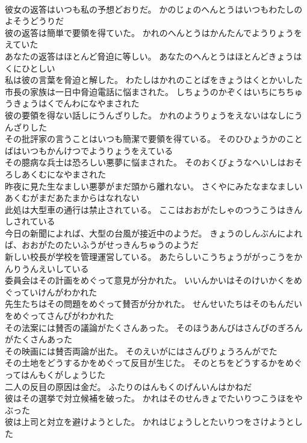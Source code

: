 \documentclass[8pt]{extreport}
\begin{document}
\begin{CJK}{UTF8}{min}
\\	彼女の返答はいつも私の予想どおりだ。	かのじょのへんとうはいつもわたしのよそうどうりだ 
\\	彼の返答は簡単で要領を得ていた。	かれのへんとうはかんたんでようりょうをえていた 
\\	あなたの返答はほとんど脅迫に等しい。	あなたのへんとうはほとんどきょうはくにひとしい 
\\	私は彼の言葉を脅迫と解した。	わたしはかれのことばをきょうはくとかいした 
\\	市長の家族は一日中脅迫電話に悩まされた。	しちょうのかぞくはいちにちちゅうきょうはくでんわになやまされた
\\	彼の要領を得ない話しにうんざりした。	かれのようりょうをえないはなしにうんざりした 
\\	その批評家の言うことはいつも簡潔で要領を得ている。	そのひひょうかのことばはいつもかんけつでようりょうをえている 
\\	その臆病な兵士は恐ろしい悪夢に悩まされた。	そのおくびょうなへいしはおそろしあくむになやまされた 
\\	昨夜に見た生なましい悪夢がまだ頭から離れない。	さくやにみたなまなましいあくむがまだあたまからはなれない 
\\	此処は大型車の通行は禁止されている。	ここはおおがたしゃのつうこうはきんしされている 
\\	今日の新聞によれば、大型の台風が接近中のようだ。	きょうのしんぶんによれば、おおがたのたいふうがせっきんちゅうのようだ 
\\	新しい校長が学校を管理運営している。	あたらしいこうちょうががっこうをかんりうんえいしている 
\\	委員会はその計画をめぐって意見が分かれた。	いいんかいはそのけいかくをめぐっていけんがわかれた 
\\	先生たちはその問題をめぐって賛否が分かれた。	せんせいたちはそのもんだいをめぐってさんぴがわかれた 
\\	その法案には賛否の議論がたくさんあった。	そのほうあんびはさんぴのぎろんがたくさんあった 
\\	その映画には賛否両論が出た。	そのえいがにはさんぴりょうろんがでた 
\\	その土地をどうするかをめぐって反目が生じた。	そのとちをどうするかをめぐってはんもくがしょうじた 
\\	二人の反目の原因は金だ。	ふたりのはんもくのげんいんはかねだ 
\\	彼はその選挙で対立候補を破った。	かれはそのせんきょでたいりつこうほをやぶった 
\\	彼は上司と対立を避けようとした。	かれはじょうしとたいりつをさけようとした 

\end{CJK}
\end{document}
